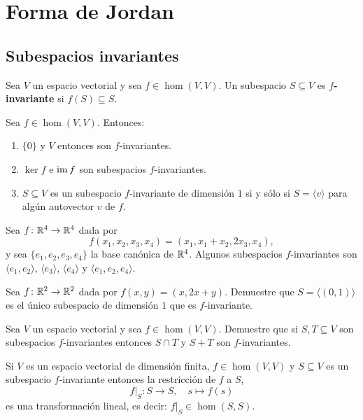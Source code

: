 \chapter{Forma de Jordan}

\section{Subespacios invariantes}

\begin{block}
    Sea $V$ un espacio vectorial y sea $f\in\hom(V,V)$. Un subespacio
    $S\subseteq V$ es \textbf{$f$-invariante} si $f(S)\subseteq S$.
\end{block}

\begin{examples}
	Sea $f\in\hom(V,V)$. Entonces:
	\begin{enumerate}
		\item $\{0\}$ y $V$ entonces son $f$-invariantes. 
		\item $\ker f$ e $\operatorname{im} f$ son subespacios $f$-invariantes. 
		\item $S\subseteq V$ es un subespacio $f$-invariante de dimensión $1$
			si y sólo si $S=\langle v\rangle$ para algún autovector $v$ de
			$f$.
	\end{enumerate}
\end{examples}

\begin{example}
	Sea $f\colon\mathbb{R}^4\to\mathbb{R}^4$ dada por \[
		f(x_1,x_2,x_3,x_4)=(x_1,x_1+x_2,2x_3,x_4),
	\]
	y sea $\{e_1,e_2,e_3,e_4\}$ la base canónica de $\mathbb{R}^4$. Algunos
	subespacios $f$-invariantes son $\langle e_1,e_2\rangle$, $\langle
	e_3\rangle$, $\langle e_4\rangle$ y $\langle e_1,e_2,e_4\rangle$.
\end{example}

\begin{xca}
	Sea $f\colon\mathbb{R}^2\to\mathbb{R}^2$ dada por $f(x,y)=(x,2x+y)$. Demuestre que
	$S=\langle(0,1)\rangle$ es el único subespacio de dimensión $1$ que es
	$f$-invariante.
\end{xca}

\begin{xca}
	Sea $V$ un espacio vectorial y sea $f\in\hom(V,V)$. Demuestre que si
	$S,T\subseteq V$ son subespacios $f$-invariantes entonces $S\cap T$ y $S+T$
	son $f$-invariantes.
\end{xca}

\begin{block}
	Si $V$ es un espacio vectorial de dimensión finita, $f\in\hom(V,V)$ y
	$S\subseteq V$ es un subespacio $f$-invariante entonces la restricción de
	$f$ a $S$, 
	\[
		f|_S\colon S\to S,\quad
		s\mapsto f(s)
	\]
	es una transformación lineal, es decir: $f|_S\in\hom(S,S)$.
\end{block}

